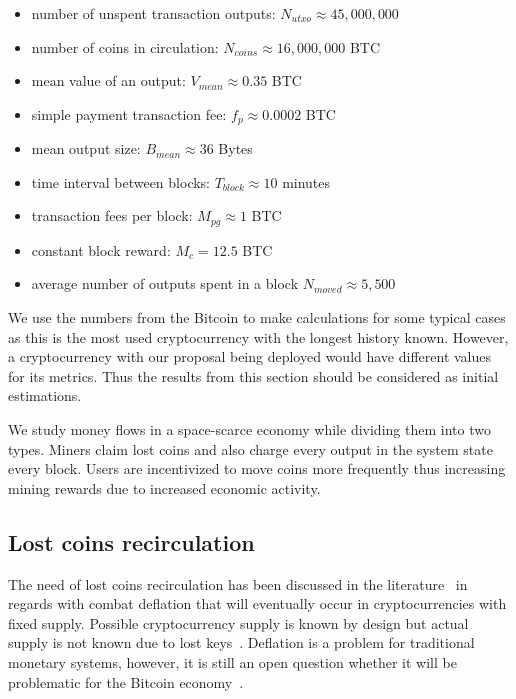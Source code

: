 \documentclass[]{llncs}   %
\begin{document}
\begin{itemize}
  \item number of unspent transaction outputs: $N_{utxo} \approx 45,000,000$
  \item number of coins in circulation: $N_{coins} \approx 16,000,000$ BTC
  \item mean value of an output: $V_{mean} \approx 0.35$ BTC
  \item simple payment transaction fee: $f_{p} \approx 0.0002$ BTC
  \item mean output size: $B_{mean} \approx 36$ Bytes
  \item time interval between blocks: $T_{block} \approx 10$ minutes
  \item transaction fees per block: $M_{pg} \approx 1$ BTC
  \item constant block reward: $M_c = 12.5$ BTC
  \item average number of outputs spent in a block $N_{moved} \approx 5,500$ 
\end{itemize}

We use the numbers from the Bitcoin to make calculations for some typical cases as this is the most used cryptocurrency with the longest history known. However, a cryptocurrency with our proposal being deployed would have different values for its metrics. Thus the results from this section should be considered as initial estimations.

We study money flows in a space-scarce economy while dividing them into two types. Miners claim lost coins and also charge every output in the system state every block. Users are incentivized to move coins more frequently thus increasing mining rewards due to increased economic activity.  

\subsection{Lost coins recirculation}
\label{sec:re}

The need of lost coins recirculation has been discussed in the literature~\cite{gjermundrod2014recirculating,gjermundrod2016going} in regards with combat deflation that will eventually occur in cryptocurrencies with fixed supply. Possible cryptocurrency supply is known by design but actual supply is not known due to lost keys~\cite{ron2013quantitative}. Deflation is a problem for traditional monetary systems, however, it is still an open question whether it will be problematic for the Bitcoin economy~\cite{bitcoinDeflationarySpiral,barber2012bitter}.
\end{document}
